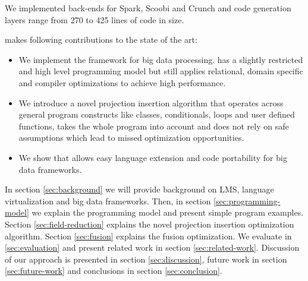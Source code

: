 
We implemented back-ends for Spark, Scoobi \cite{nicta_scoobi_2012} and Crunch \cite{_crunch_2012} and code generation layers range from 270 to 425 lines of code in size. 

\tool makes following contributions to the state of the art:    
\begin{itemize}


  \item {}We implement the \tool framework for big data processing. \tool has a slightly restricted and high level programming model but still applies relational, domain specific and compiler optimizations to achieve high performance.


  \item We introduce a novel projection insertion algorithm that operates across general program constructs like classes, conditionals, loops and user defined functions, takes the whole program into account and does not rely on safe assumptions which lead to missed optimization opportunities.  


  \item We show that \tool allows easy language extension and code portability for big data frameworks. 

\end{itemize} 

In section \ref{sec:background} we will provide background on LMS, language virtualization and big data frameworks. Then, in section \ref{sec:programming-model} we explain the programming model and present simple program examples. Section \ref{sec:field-reduction} explains the novel projection insertion optimization algorithm. Section \ref{sec:fusion} explains the fusion optimization. We evaluate \tool in \ref{sec:evaluation} and present related work in section \ref{sec:related-work}. Discussion of our approach is presented in section \ref{sec:discussion}, future work in section \ref{sec:future-work} and conclusions in section \ref{sec:conclusion}.
